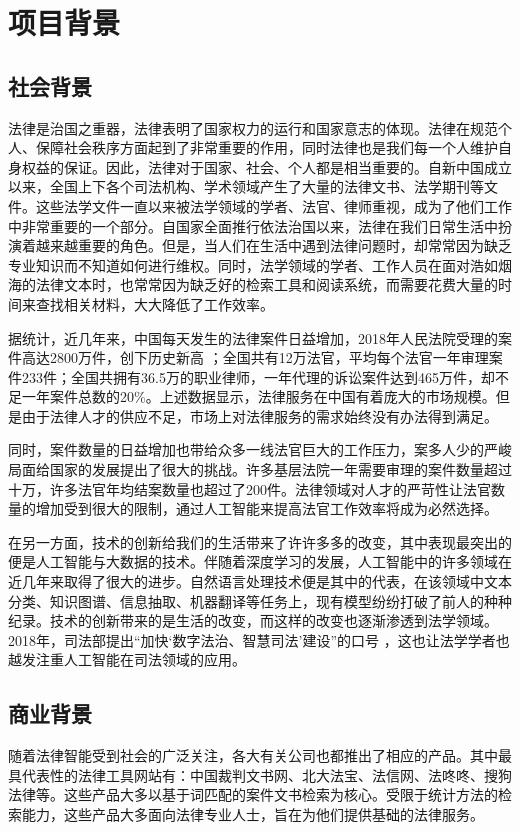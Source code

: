\chapter{项目背景}
\label{cha:background}


\section{社会背景}
法律是治国之重器，法律表明了国家权力的运行和国家意志的体现。法律在规范个人、保障社会秩序方面起到了非常重要的作用，同时法律也是我们每一个人维护自身权益的保证。因此，法律对于国家、社会、个人都是相当重要的。自新中国成立以来，全国上下各个司法机构、学术领域产生了大量的法律文书、法学期刊等文件。这些法学文件一直以来被法学领域的学者、法官、律师重视，成为了他们工作中非常重要的一个部分。自国家全面推行依法治国以来，法律在我们日常生活中扮演着越来越重要的角色。但是，当人们在生活中遇到法律问题时，却常常因为缺乏专业知识而不知道如何进行维权。同时，法学领域的学者、工作人员在面对浩如烟海的法律文本时，也常常因为缺乏好的检索工具和阅读系统，而需要花费大量的时间来查找相关材料，大大降低了工作效率。

据统计，近几年来，中国每天发生的法律案件日益增加，2018年人民法院受理的案件高达2800万件，创下历史新高 ；全国共有12万法官，平均每个法官一年审理案件233件；全国共拥有36.5万的职业律师，一年代理的诉讼案件达到465万件，却不足一年案件总数的20\%。上述数据显示，法律服务在中国有着庞大的市场规模。但是由于法律人才的供应不足，市场上对法律服务的需求始终没有办法得到满足。

同时，案件数量的日益增加也带给众多一线法官巨大的工作压力，案多人少的严峻局面给国家的发展提出了很大的挑战。许多基层法院一年需要审理的案件数量超过十万，许多法官年均结案数量也超过了200件。法律领域对人才的严苛性让法官数量的增加受到很大的限制，通过人工智能来提高法官工作效率将成为必然选择。 

在另一方面，技术的创新给我们的生活带来了许许多多的改变，其中表现最突出的便是人工智能与大数据的技术。伴随着深度学习的发展，人工智能中的许多领域在近几年来取得了很大的进步。自然语言处理技术便是其中的代表，在该领域中文本分类、知识图谱、信息抽取、机器翻译等任务上，现有模型纷纷打破了前人的种种纪录。技术的创新带来的是生活的改变，而这样的改变也逐渐渗透到法学领域。2018年，司法部提出“加快‘数字法治、智慧司法’建设”的口号 ，这也让法学学者也越发注重人工智能在司法领域的应用。


\section{商业背景}
随着法律智能受到社会的广泛关注，各大有关公司也都推出了相应的产品。其中最具代表性的法律工具网站有：中国裁判文书网、北大法宝、法信网、法咚咚、搜狗法律等。这些产品大多以基于词匹配的案件文书检索为核心。受限于统计方法的检索能力，这些产品大多面向法律专业人士，旨在为他们提供基础的法律服务。


